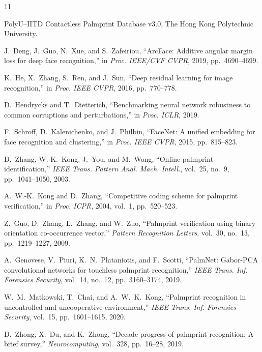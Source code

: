 \documentclass[conference]{IEEEtran}
\begin{document}

\begin{thebibliography}{11}

PolyU--IITD Contactless Palmprint Database v3.0, The Hong Kong Polytechnic University.

J.~Deng, J.~Guo, N.~Xue, and S.~Zafeiriou, ``ArcFace: Additive angular margin loss for deep face recognition,'' in \textit{Proc. IEEE/CVF CVPR}, 2019, pp.~4690--4699.

K.~He, X.~Zhang, S.~Ren, and J.~Sun, ``Deep residual learning for image recognition,'' in \textit{Proc. IEEE CVPR}, 2016, pp.~770--778.

D.~Hendrycks and T.~Dietterich, ``Benchmarking neural network robustness to common corruptions and perturbations,'' in \textit{Proc. ICLR}, 2019.

F.~Schroff, D.~Kalenichenko, and J.~Philbin, ``FaceNet: A unified embedding for face recognition and clustering,'' in \textit{Proc. IEEE CVPR}, 2015, pp.~815--823.

D.~Zhang, W.-K.~Kong, J.~You, and M.~Wong, ``Online palmprint identification,'' \textit{IEEE Trans. Pattern Anal. Mach. Intell.}, vol.~25, no.~9, pp.~1041--1050, 2003.

A.~W.-K.~Kong and D.~Zhang, ``Competitive coding scheme for palmprint verification,'' in \textit{Proc. ICPR}, 2004, vol.~1, pp.~520--523.

Z.~Guo, D.~Zhang, L.~Zhang, and W.~Zuo, ``Palmprint verification using binary orientation co-occurrence vector,'' \textit{Pattern Recognition Letters}, vol.~30, no.~13, pp.~1219--1227, 2009.

A.~Genovese, V.~Piuri, K.~N.~Plataniotis, and F.~Scotti, ``PalmNet: Gabor-PCA convolutional networks for touchless palmprint recognition,'' \textit{IEEE Trans. Inf. Forensics Security}, vol.~14, no.~12, pp.~3160--3174, 2019.

W.~M.~Matkowski, T.~Chai, and A.~W.~K.~Kong, ``Palmprint recognition in uncontrolled and uncooperative environment,'' \textit{IEEE Trans. Inf. Forensics Security}, vol.~15, pp.~1601--1615, 2020.

D.~Zhong, X.~Du, and K.~Zhong, ``Decade progress of palmprint recognition: A brief survey,'' \textit{Neurocomputing}, vol.~328, pp.~16--28, 2019.

\end{thebibliography}
\end{document}
